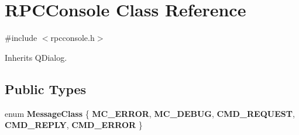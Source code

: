 \hypertarget{class_r_p_c_console}{}\section{R\+P\+C\+Console Class Reference}
\label{class_r_p_c_console}


{\ttfamily \#include $<$rpcconsole.\+h$>$}



Inherits Q\+Dialog.

\subsection*{Public Types}
\begin{DoxyCompactItemize}
\item 
\mbox{\label{class_r_p_c_console_a8924901fe2574698b55f173ef576c83e}} 
enum {\bfseries Message\+Class} \{ \newline
{\bfseries M\+C\+\_\+\+E\+R\+R\+OR}, 
{\bfseries M\+C\+\_\+\+D\+E\+B\+UG}, 
{\bfseries C\+M\+D\+\_\+\+R\+E\+Q\+U\+E\+ST}, 
{\bfseries C\+M\+D\+\_\+\+R\+E\+P\+LY}, 
\newline
{\bfseries C\+M\+D\+\_\+\+E\+R\+R\+OR}
 \}
\end{DoxyCompactItemize}
